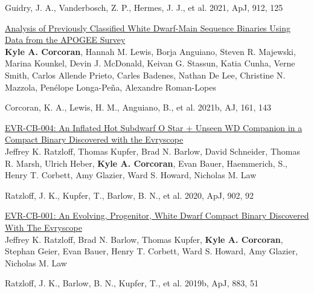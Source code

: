\documentclass[letterpaper,12pt]{article}
\begin{document}
\begin{etaremune}
Guidry, J. A., Vanderbosch, Z. P., Hermes, J. J., et al. 2021, ApJ, 912, 125
\item \href{https://arxiv.org/pdf/2012.12997.pdf}{\textcolor{rotundaorange}{Analysis of Previously Classified White Dwarf-Main Sequence Binaries Using Data from the APOGEE Survey}} \\
\textbf{Kyle A. Corcoran}, Hannah M. Lewis, Borja Anguiano, Steven R. Majewski, Marina Kounkel, Devin J. McDonald, Keivan G. Stassun, Katia Cunha, Verne Smith, Carlos Allende Prieto, Carles Badenes, Nathan De Lee, Christine N. Mazzola, Pen{\'e}lope Longa-Pe{\~n}a, Alexandre Roman-Lopes

Corcoran, K. A., Lewis, H. M., Anguiano, B., et al. 2021b, AJ, 161, 143
\item \href{https://arxiv.org/pdf/2009.06074.pdf}{\textcolor{rotundaorange}{EVR-CB-004: An Inflated Hot Subdwarf O Star + Unseen WD Companion in a Compact Binary Discovered with the Evryscope}} \\
Jeffrey K. Ratzloff, Thomas Kupfer, Brad N. Barlow, David Schneider, Thomas R. Marsh, Ulrich Heber, \textbf{Kyle A. Corcoran}, Evan Bauer, Haemmerich, S., Henry T. Corbett, Amy Glazier, Ward S. Howard, Nicholas M. Law

Ratzloff, J. K., Kupfer, T., Barlow, B. N., et al. 2020, ApJ, 902, 92
\item \href{https://arxiv.org/pdf/1909.02012.pdf}{\textcolor{rotundaorange}{EVR-CB-001: An Evolving, Progenitor, White Dwarf Compact Binary Discovered With The Evryscope}}\\
Jeffrey K. Ratzloff, Brad N. Barlow, Thomas Kupfer, \textbf{Kyle A. Corcoran}, Stephan Geier, Evan Bauer, Henry T. Corbett, Ward S. Howard, Amy Glazier, Nicholas M. Law

Ratzloff, J. K., Barlow, B. N., Kupfer, T., et al. 2019b, ApJ, 883, 51
\end{etaremune}
\end{document}
